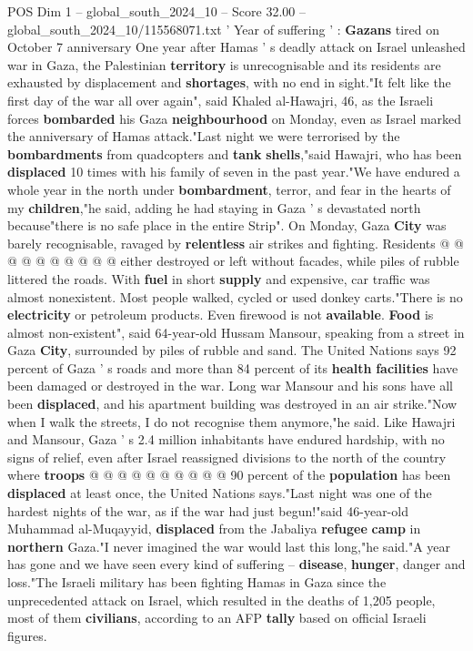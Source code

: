 \begin{textsample}{POS Dim 1 – global\_south\_2024\_10 – Score 32.00 – global\_south\_2024\_10/115568071.txt}  \label{ex:f1_pos_164}
' Year of suffering ' : \textbf{Gazans} tired on October 7 anniversary One year after Hamas ' s deadly attack on Israel unleashed war in Gaza, the Palestinian \textbf{territory} is unrecognisable and its residents are exhausted by displacement and \textbf{shortages}, with no end in sight."It felt like the first day of the war all over again", said Khaled al-Hawajri, 46, as the Israeli forces \textbf{bombarded} his Gaza \textbf{neighbourhood} on Monday, even as Israel marked the anniversary of Hamas attack."Last night we were terrorised by the \textbf{bombardments} from quadcopters and \textbf{tank} \textbf{shells},"said Hawajri, who has been \textbf{displaced} 10 times with his family of seven in the past year."We have endured a whole year in the north under \textbf{bombardment}, terror, and fear in the hearts of my \textbf{children},"he said, adding he had staying in Gaza ' s devastated north because"there is no safe place in the entire Strip".
On Monday, Gaza \textbf{City} was barely recognisable, ravaged by \textbf{relentless} air strikes and fighting.
Residents @ @ @ @ @ @ @ @ @ @ either destroyed or left without facades, while piles of rubble littered the roads.
With \textbf{fuel} in short \textbf{supply} and expensive, car traffic was almost nonexistent.
Most people walked, cycled or used donkey carts."There is no \textbf{electricity} or petroleum products.
Even firewood is not \textbf{available}. \textbf{Food} is almost non-existent", said 64-year-old Hussam Mansour, speaking from a street in Gaza \textbf{City}, surrounded by piles of rubble and sand.
The United Nations says 92 percent of Gaza ' s roads and more than 84 percent of its \textbf{health} \textbf{facilities} have been damaged or destroyed in the war.
Long war Mansour and his sons have all been \textbf{displaced}, and his apartment building was destroyed in an air strike."Now when I walk the streets, I do not recognise them anymore,"he said.
Like Hawajri and Mansour, Gaza ' s 2.4 million inhabitants have endured hardship, with no signs of relief, even after Israel reassigned divisions to the north of the country where \textbf{troops} @ @ @ @ @ @ @ @ @ @ 90 percent of the \textbf{population} has been \textbf{displaced} at least once, the United Nations says."Last night was one of the hardest nights of the war, as if the war had just begun!"said 46-year-old Muhammad al-Muqayyid, \textbf{displaced} from the Jabaliya \textbf{refugee} \textbf{camp} in \textbf{northern} Gaza."I never imagined the war would last this long,"he said."A year has gone and we have seen every kind of suffering -- \textbf{disease}, \textbf{hunger}, danger and loss."The Israeli military has been fighting Hamas in Gaza since the unprecedented attack on Israel, which resulted in the deaths of 1,205 people, most of them \textbf{civilians}, according to an AFP \textbf{tally} based on official Israeli figures.

\end{textsample}
